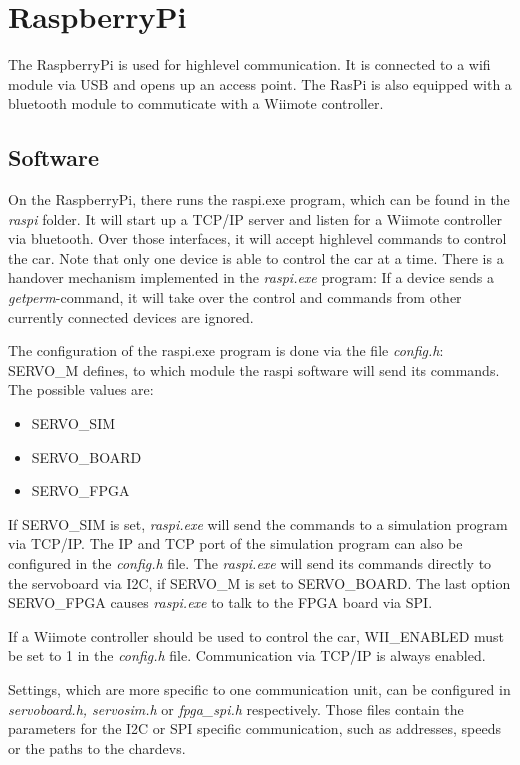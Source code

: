 \documentclass[12pt]{article}
\begin{document}
\section{RaspberryPi}
The RaspberryPi is used for highlevel communication.
It is connected to a wifi module via USB and opens up an access point.
The RasPi is also equipped with a bluetooth module to commuticate with a Wiimote controller.

\subsection{Software}
On the RaspberryPi, there runs the raspi.exe program, which can be found in the \textit{raspi} folder.
It will start up a TCP/IP server and listen for a Wiimote controller via bluetooth.
Over those interfaces, it will accept highlevel commands to control the car.
Note that only one device is able to control the car at a time.
There is a handover mechanism implemented in the \textit{raspi.exe} program: If a device sends a \textit{getperm}-command, it will take over the control and commands from other currently connected devices are ignored.


The configuration of the raspi.exe program is done via the file \textit{config.h}:
SERVO\_M defines, to which module the raspi software will send its commands. The possible values are:
\begin{itemize}
\item{SERVO\_SIM}
\item{SERVO\_BOARD}
\item{SERVO\_FPGA}
\end{itemize}

If SERVO\_SIM is set, \textit{raspi.exe} will send the commands to a simulation program via TCP/IP.
The IP and TCP port of the simulation program can also be configured in the \textit{config.h} file.
The \textit{raspi.exe} will send its commands directly to the servoboard via I2C, if SERVO\_M is set to SERVO\_BOARD.
The last option SERVO\_FPGA causes \textit{raspi.exe} to talk to the FPGA board via SPI.

If a Wiimote controller should be used to control the car, WII\_ENABLED must be set to 1 in the \textit{config.h} file.
Communication via TCP/IP is always enabled.

Settings, which are more specific to one communication unit, can be configured in \textit{servoboard.h, servosim.h} or \textit{fpga\_spi.h} respectively. Those files contain the parameters for the I2C or SPI specific communication, such as addresses, speeds or the paths to the chardevs.
\end{document}
